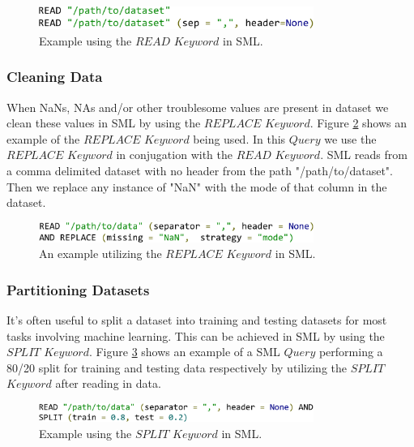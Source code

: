 \documentclass[jair,twoside,11pt,theapa]{article}
\begin{document}
\begin{figure}
\includegraphics[width=0.8\textwidth]{figs/READ.png}
\centering
\caption{Example using the \(READ\) \(Keyword\) in SML.}
\label{fig:SML:READ}
\end{figure}

\subsubsection{Cleaning Data}
When NaNs, NAs and/or other troublesome values are present in dataset we clean these values in SML by using the \(REPLACE\) \(Keyword\).  Figure \ref{fig:SML:REPLACE}  shows an example of the \(REPLACE\) \(Keyword\) being used. In this \(Query\) we use the \(REPLACE\) \(Keyword\) in conjugation with the \(READ\) \(Keyword\). SML reads from a comma delimited dataset with no header from the path "/path/to/dataset". Then we replace any instance of "NaN" with the mode of that column in the dataset.

\begin{figure}
\includegraphics[width=0.8\textwidth]{figs/REPLACE.png}
\centering
\caption{An example utilizing the \(REPLACE\) \(Keyword\) in SML.}
\label{fig:SML:REPLACE}
\end{figure}

\subsubsection{Partitioning Datasets}
It's often useful to split a dataset into training and testing datasets for most tasks involving machine learning. This can be achieved in SML by using the \(SPLIT\) \(Keyword\). Figure \ref{fig:SML:SPLIT} shows an example of a SML \(Query\) performing a 80/20 split for training and testing data respectively by utilizing the \(SPLIT\) \(Keyword\) after reading in data.

\begin{figure}
\includegraphics[width=0.8\textwidth]{figs/SPLIT.png}
\centering
\caption{Example using the \(SPLIT\) \(Keyword\) in SML.}
\label{fig:SML:SPLIT}
\end{figure}
\end{document}

